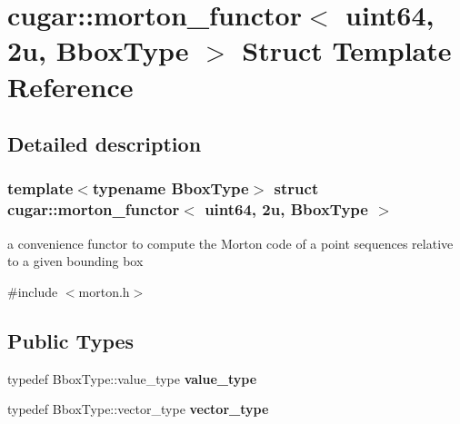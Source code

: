 \hypertarget{structcugar_1_1morton__functor_3_01uint64_00_012u_00_01_bbox_type_01_4}{}\section{cugar\+:\+:morton\+\_\+functor$<$ uint64, 2u, Bbox\+Type $>$ Struct Template Reference}
\label{structcugar_1_1morton__functor_3_01uint64_00_012u_00_01_bbox_type_01_4}


\subsection{Detailed description}
\subsubsection*{template$<$typename Bbox\+Type$>$\newline
struct cugar\+::morton\+\_\+functor$<$ uint64, 2u, Bbox\+Type $>$}

a convenience functor to compute the Morton code of a point sequences relative to a given bounding box 

{\ttfamily \#include $<$morton.\+h$>$}

\subsection*{Public Types}
\begin{DoxyCompactItemize}
\item 
\mbox{\label{structcugar_1_1morton__functor_3_01uint64_00_012u_00_01_bbox_type_01_4_a7aefb0a0d93c7d830a2c0e72368a22c0}} 
typedef Bbox\+Type\+::value\+\_\+type {\bfseries value\+\_\+type}
\item 
\mbox{\label{structcugar_1_1morton__functor_3_01uint64_00_012u_00_01_bbox_type_01_4_a8e72531d34149cd3aaf45a5f90f0de77}} 
typedef Bbox\+Type\+::vector\+\_\+type {\bfseries vector\+\_\+type}
\end{DoxyCompactItemize}
